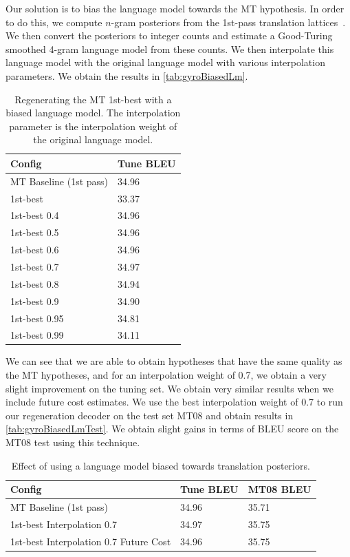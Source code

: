 Our solution is to bias the language model towards the MT hypothesis.
In order to do this, we compute $n$-gram posteriors from the
1st-pass translation lattices~\citep{blackwood:2010:PHD}.
We then convert the posteriors
to integer counts and estimate a
Good-Turing~\citep{good:1953:biometrika,chen-goodman:1998:harvard} smoothed 4-gram
language model from these counts.
We then interpolate this language model with the original language model with
various interpolation parameters.
We obtain the results in \autoref{tab:gyroBiasedLm}.
%
\begin{table}
  \begin{center}
    \begin{tabular}{l|l}
      Config      & Tune BLEU \\
      \hline
      MT Baseline (1st pass) & 34.96 \\
      \hline
      1st-best      & 33.37 \\
      \hline
      1st-best 0.4  & 34.96 \\
      1st-best 0.5  & 34.96 \\
      1st-best 0.6  & 34.96 \\
      1st-best 0.7  & 34.97 \\
      1st-best 0.8  & 34.94 \\
      1st-best 0.9  & 34.90 \\
      1st-best 0.95 & 34.81 \\
      1st-best 0.99 & 34.11 \\
    \end{tabular}
    \caption{Regenerating the MT 1st-best with a biased language model.
      The interpolation parameter is the interpolation weight of the
      original language model.}
    \label{tab:gyroBiasedLm}
  \end{center}
\end{table}
%
We can see that we are able to obtain hypotheses that have
the same quality as the MT hypotheses, and for an interpolation
weight of 0.7, we obtain a very slight improvement on the tuning
set.
We obtain very similar results when we include future cost estimates.
We use the best interpolation weight of 0.7 to run
our regeneration decoder on the test set MT08 and obtain results
in \autoref{tab:gyroBiasedLmTest}.
We obtain slight gains in terms of BLEU score on the MT08 test
using this technique.
%
\begin{table}
  \begin{center}
    \begin{tabular}{l|l|l}
      Config & Tune BLEU & MT08 BLEU \\
      \hline
      MT Baseline (1st pass) & 34.96 & 35.71 \\
      \hline
      1st-best Interpolation 0.7 & 34.97 & 35.75 \\
      1st-best Interpolation 0.7 Future Cost & 34.96 & 35.75 \\
    \end{tabular}
    \caption{Effect of using a language model biased towards
    translation posteriors.}
    \label{tab:gyroBiasedLmTest}
  \end{center}
\end{table}

